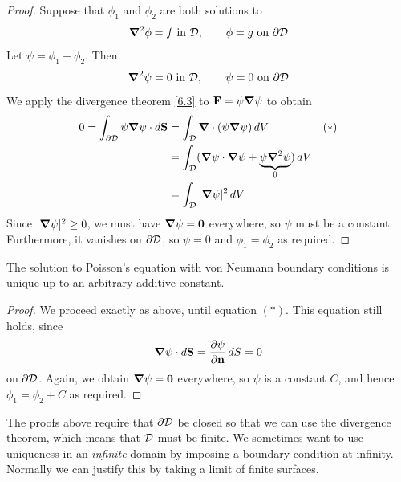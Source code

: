 \documentclass{../../template/note}
\begin{document}
    \begin{proof}
        Suppose that \(\phi_1\) and \(\phi_2\) are both solutions to
        \begin{align*}
            \grad^2\phi = f \text{ in } \mc D, \qquad \phi = g \text{ on } \pr \mc D
        \end{align*}
        Let \(\psi = \phi_1 - \phi_2\). Then
        \begin{align*}
            \grad^2\psi = 0 \text{ in } \mc D, \qquad \psi = 0 \text{ on } \pr \mc D
        \end{align*}
        We apply the divergence theorem \ref{6.3} to \(\V F = \psi \grad \psi\) to obtain
        \begin{align*}
            0 = \int_{\pr\mc D} \psi \grad \psi \cdot d\V S &= \int_{\mc D} \div(\psi \grad \psi) \D V && (*) \\
            &= \int_{\mc D} (\grad \psi \cdot \grad \psi + \underbrace{\psi \grad^2 \psi}_0) \D V \\
            &= \int_{\mc D} |\grad \psi|^2 \D V
        \end{align*}
        Since \(|\grad \psi|^2 \geq 0\), we must have \(\grad \psi = \V 0\) everywhere, so \(\psi\) must be a constant. Furthermore, it vanishes on \(\partial \mathcal{D}\), so \(\psi = 0\) and \(\phi_1 = \phi_2\) as required.
    \end{proof}
    
    \begin{proposition*}
        The solution to Poisson's equation with von Neumann boundary conditions is unique up to an arbitrary additive constant.
    \end{proposition*}
    
    \begin{proof}
        We proceed exactly as above, until equation \((*)\). This equation still holds, since
        \begin{align*}
            \grad \psi \cdot d \V S = \pd{\psi}{\V n}\D S = 0
        \end{align*}
        on \(\partial \mathcal{D}\). Again, we obtain \(\grad \psi = \V 0\) everywhere, so \(\psi\) is a constant \(C\), and hence \(\phi_1 = \phi_2 + C\) as required.        
    \end{proof}
    
    \begin{remark*}
        The proofs above require that \(\partial \mathcal{D}\) be closed so that we can use the divergence theorem, which means that \(\mathcal{D}\) must be finite. We sometimes want to use uniqueness in an \emph{infinite} domain by imposing a boundary condition at infinity. Normally we can justify this by taking a limit of finite surfaces.
    \end{remark*}
    
\end{document}
